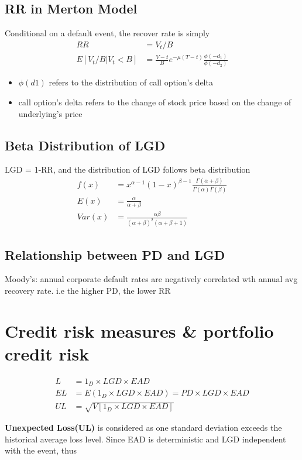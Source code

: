 \documentclass{article}
\theoremstyle{definition}
\theoremstyle{thrm}
\theoremstyle{lma}
\theoremstyle{ppst}
\theoremstyle{crlr}
\begin{document}
\subsection{RR in Merton Model}
Conditional on a default event, the recover rate is simply 
\begin{align*}
	RR &= V_t/B\\
	E[V_t/B | V_t < B] &= \frac{V-t}{B}e^{-\mu(T-t)}\frac{\phi(-d_1)}{\phi(-d_2)}
\end{align*}
\begin{itemize}
	\item $\phi(d1)$ refers to the distribution of call option's delta
	\item call option's delta refers to the change of stock price based on the change of underlying's price
\end{itemize}

\subsection{Beta Distribution of LGD}
LGD = 1-RR, and the distribution of LGD follows beta distribution
\begin{align*}
	f(x) &= x^{\alpha - 1}(1-x)^{\beta-1}\frac{\Gamma (\alpha + \beta)}{\Gamma(\alpha) \Gamma(\beta)}\\
	E(x) &= \frac{\alpha}{\alpha+\beta}\\
	Var(x) &= \frac{\alpha\beta}{(\alpha+\beta)^2(\alpha+\beta+1)} 
\end{align*}

\subsection{Relationship between PD and LGD}
Moody's: annual corporate default rates are negatively correlated wth annual avg recovery rate. i.e the higher PD, the lower RR

\section{Credit risk measures \& portfolio credit risk}

\begin{align*}
	L &= 1_D \times LGD \times EAD\\
	EL &= E(1_D \times LGD \times EAD) = PD \times LGD \times EAD\\
	UL &= \sqrt{V[1_D \times LGD \times EAD]}
\end{align*}

\textbf{Unexpected Loss(UL)} is considered as one standard deviation exceeds the historical average loss level. Since EAD is deterministic and LGD independent with the event, thus
\end{document}
